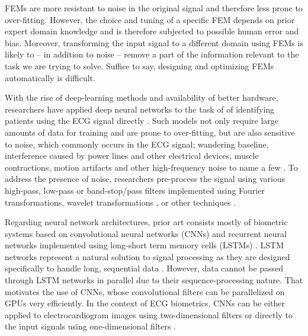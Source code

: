 \documentclass[preprint,12pt]{elsarticle}
\begin{document}
FEMs are more resistant to noise in the original signal and therefore less prone to over-fitting. However, the choice and tuning of a specific FEM depends on prior expert domain knowledge and is therefore subjected to possible human error and bias. Moreover, transforming the input signal to a different domain using FEMs is likely to -- in addition to noise -- remove a part of the information relevant to the task we are trying to solve. Suffice to say, designing and optimizing FEMs automatically is difficult.

With the rise of deep-learning methods and availability of better hardware, researchers have applied deep neural networks to the task of of identifying patients using the ECG signal directly \cite{labati2019deep, jyotishi2020lstm, hammad2018multimodal, jyotishi2021ecg}. Such models not only require large amounts of data for training and are prone to over-fitting, but are also sensitive to noise, which commonly occurs in the ECG signal; wandering baseline, interference caused by power lines and other electrical devices, muscle contractions, motion artifacts and other high-frequency noise to name a few \cite{nayak2012filtering}. To address the presence of noise, researchers pre-process the signal \cite{li2017genetic, lyakhov2021system, tyagi2021intellectual, ji2019electrocardiogram, perez2016application} using 
various high-pass, low-pass or band-stop/pass filters implemented using Fourier transformations, \cite{singhal2020efficient} wavelet transformations \cite{lyakhov2021system, chen2015hardware}, or other techniques \cite{labati2019deep}.

Regarding neural network architectures, prior art consists mostly of biometric systems based on convolutional neural networks (CNNs) \cite{labati2019deep, deshmane2018ecg, hammad2021resnet, hammad2018multimodal, melzi2023ecg} and recurrent neural networks implemented using long-short term memory cells (LSTMs) \cite{kim2020ecg, jyotishi2020lstm, jyotishi2021ecg}. LSTM networks represent a natural solution to signal processing as they are designed specifically to handle long, sequential data \cite{hochreiter1997long}. However, data cannot be passed through LSTM networks in parallel due to their sequence-processing nature. That motivates the use of CNNs, whose convolutional filters can be parallelized on GPUs very efficiently. In the context of ECG biometrics, CNNs can be either applied to electrocardiogram images using two-dimensional filters \cite{hanilcci2019ecg, lee2022personal, labati2019deep} or directly to the input signals using one-dimensional filters \cite{hammad2021resnet}.
\end{document}
